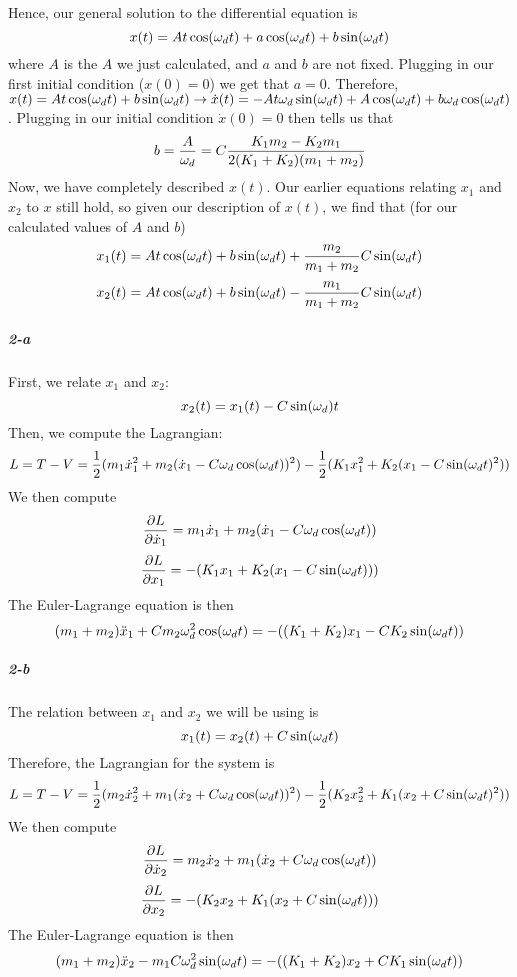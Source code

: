 Hence, our general solution to the differential equation is
$$x(t)=A t\cos(\omega_d t)+a \cos(\omega_d t)+b\sin(\omega_d t)$$
where $A$ is the $A$ we just calculated, and $a$ and $b$ are not fixed.  Plugging in our first initial condition ($x(0)=0$) we get that $a=0$.  Therefore, $x(t)=At\cos(\omega_d t)+b\sin(\omega_d t)\rightarrow \dot x(t)=-At \omega_d \sin(\omega_d t)+ A\cos(\omega_d t)+b\omega_d\cos(\omega_d t)$.  Plugging in our initial condition $\dot x(0)=0$ then tells us that
$$b=\frac{A}{\omega_d}=C\frac{K_1 m_2-K_2 m_1}{2(K_1+K_2)(m_1+m_2)}$$
Now, we have completely described $x(t)$.  Our earlier equations relating $x_1$ and $x_2$ to $x$ still hold, so given our description of $x(t)$, we find that (for our calculated values of $A$ and $b$)
$$x_1(t)=At \cos(\omega_d t)+b\sin(\omega_d t)+\frac{m_2}{m_1+m_2} C\sin(\omega_d t)$$
$$x_2(t)=At\cos(\omega_d t)+b\sin(\omega_d t)-\frac{m_1}{m_1+m_2}C\sin(\omega_d t)$$
\subparagraph{2-a}  First, we relate $x_1$ and $x_2$:
$$x_2(t)= x_1(t)-C\sin(\omega_d) t$$
Then, we compute the Lagrangian:
$$L=T-V= \frac 1 2 (m_1 \dot x_1^2 + m_2 (\dot x_1 - C\omega_d \cos(\omega_d t))^2)-\frac 1 2 (K_1 x_1^2+K_2 (x_1-C \sin(\omega_d t)^2))$$
We then compute
$$\frac{\partial L}{\partial \dot x_1}= m_1 \dot x_1 + m_2 (\dot x_1 - C \omega_d \cos(\omega_d t))$$
$$\frac{\partial L}{\partial x_1}=-(K_1 x_1+K_2(x_1-C\sin (\omega_d t)))$$
The Euler-Lagrange equation is then 
$$  (m_1+m_2)\ddot x_1 + C m_2 \omega_d^2 \cos(\omega_d t)=-((K_1+K_2) x_1 - C K_2 \sin(\omega_d t))$$
\subparagraph{2-b}  The relation between $x_1$ and $x_2$ we will be using is
$$x_1(t)=x_2(t) + C\sin(\omega_d t)$$
Therefore, the Lagrangian for the system is 
$$L=T-V= \frac 1 2 (m_2 \dot x_2^2 + m_1 (\dot x_2 + C\omega_d \cos(\omega_d t))^2)-\frac 1 2 (K_2 x_2^2+K_1 (x_2+C \sin(\omega_d t)^2))$$
We then compute
$$\frac{\partial L}{\partial \dot x_2}= m_2 \dot x_2 + m_1 (\dot x_2+ C \omega_d \cos(\omega_d t))$$
$$\frac{\partial L}{\partial x_2}=-(K_2 x_2+K_1(x_2+C\sin (\omega_d t)))$$
The Euler-Lagrange equation is then
$$ (m_1+m_2) \ddot x_2-m_1 C \omega_d^2 \sin(\omega_d t)=-((K_1+K_2) x_2+C K_1 \sin(\omega_d t))$$

